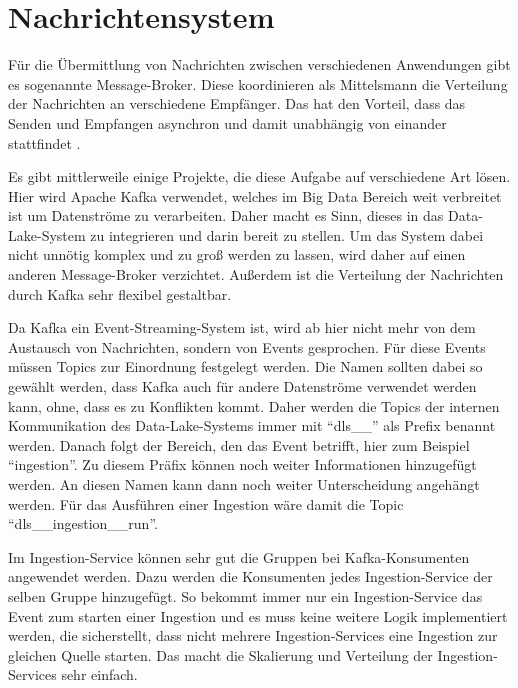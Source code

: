\section{Nachrichtensystem}

Für die Übermittlung von Nachrichten zwischen verschiedenen Anwendungen gibt es sogenannte Message-Broker.
Diese koordinieren als Mittelsmann die Verteilung der Nachrichten an verschiedene Empfänger.
Das hat den Vorteil, dass das Senden und Empfangen asynchron und damit unabhängig von einander stattfindet \parencite{message-broker}.

Es gibt mittlerweile einige Projekte, die diese Aufgabe auf verschiedene Art lösen.
Hier wird Apache Kafka verwendet, welches im Big Data Bereich weit verbreitet ist um Datenströme zu verarbeiten.
Daher macht es Sinn, dieses in das Data-Lake-System zu integrieren und darin bereit zu stellen.
Um das System dabei nicht unnötig komplex und zu groß werden zu lassen, wird daher auf einen anderen Message-Broker verzichtet.
Außerdem ist die Verteilung der Nachrichten durch Kafka sehr flexibel gestaltbar.

Da Kafka ein Event-Streaming-System ist, wird ab hier nicht mehr von dem Austausch von Nachrichten, sondern von Events gesprochen.
Für diese Events müssen Topics zur Einordnung festgelegt werden.
Die Namen sollten dabei so gewählt werden, dass Kafka auch für andere Datenströme verwendet werden kann, ohne, dass es zu Konflikten kommt.
Daher werden die Topics der internen Kommunikation des Data-Lake-Systems immer mit "`dls\_\_"' als Prefix benannt werden.
Danach folgt der Bereich, den das Event betrifft, hier zum Beispiel "`ingestion"'.
Zu diesem Präfix können noch weiter Informationen hinzugefügt werden.
An diesen Namen kann dann noch weiter Unterscheidung angehängt werden.
Für das Ausführen einer Ingestion wäre damit die Topic "`dls\_\_ingestion\_\_run"'.

Im Ingestion-Service können sehr gut die Gruppen bei Kafka-Konsumenten angewendet werden.
Dazu werden die Konsumenten jedes Ingestion-Service der selben Gruppe hinzugefügt.
So bekommt immer nur ein Ingestion-Service das Event zum starten einer Ingestion und es muss keine weitere Logik implementiert werden, die sicherstellt, dass nicht mehrere Ingestion-Services eine Ingestion zur gleichen Quelle starten.
Das macht die Skalierung und Verteilung der Ingestion-Services sehr einfach.